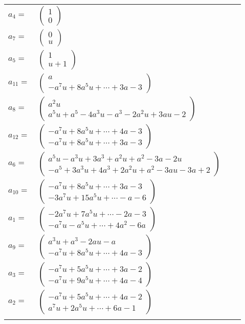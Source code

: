 \documentclass[1p]{elsarticle_modified}
\theoremstyle{definition}
\begin{document}
\begin{tabular}{m{7pt} m{180pt} m{7pt} m{180pt} }
\flushright $a_{4}=$&$\begin{pmatrix}1\\0\end{pmatrix}$ \\
\flushright $a_{7}=$&$\begin{pmatrix}0\\u\end{pmatrix}$ \\
\flushright $a_{5}=$&$\begin{pmatrix}1\\u+1\end{pmatrix}$ \\
\flushright $a_{11}=$&$\begin{pmatrix}a\\- a^7 u+8 a^5 u+\cdots+3 a-3\end{pmatrix}$ \\
\flushright $a_{8}=$&$\begin{pmatrix}a^2 u\\a^5 u+a^5-4 a^3 u- a^3-2 a^2 u+3 a u-2\end{pmatrix}$ \\
\flushright $a_{12}=$&$\begin{pmatrix}- a^7 u+8 a^5 u+\cdots+4 a-3\\- a^7 u+8 a^5 u+\cdots+3 a-3\end{pmatrix}$ \\
\flushright $a_{6}=$&$\begin{pmatrix}a^5 u- a^3 u+3 a^3+a^2 u+a^2-3 a-2 u\\- a^5+3 a^3 u+4 a^3+2 a^2 u+a^2-3 a u-3 a+2\end{pmatrix}$ \\
\flushright $a_{10}=$&$\begin{pmatrix}- a^7 u+8 a^5 u+\cdots+3 a-3\\-3 a^7 u+15 a^5 u+\cdots- a-6\end{pmatrix}$ \\
\flushright $a_{1}=$&$\begin{pmatrix}-2 a^7 u+7 a^5 u+\cdots-2 a-3\\- a^7 u- a^5 u+\cdots+4 a^2-6 a\end{pmatrix}$ \\
\flushright $a_{9}=$&$\begin{pmatrix}a^3 u+a^3-2 a u- a\\- a^7 u+8 a^5 u+\cdots+4 a-3\end{pmatrix}$ \\
\flushright $a_{3}=$&$\begin{pmatrix}- a^7 u+5 a^5 u+\cdots+3 a-2\\- a^7 u+9 a^5 u+\cdots+4 a-4\end{pmatrix}$ \\
\flushright $a_{2}=$&$\begin{pmatrix}- a^7 u+5 a^5 u+\cdots+4 a-2\\a^7 u+2 a^5 u+\cdots+6 a-1\end{pmatrix}$\\&\end{tabular}
\end{document}
